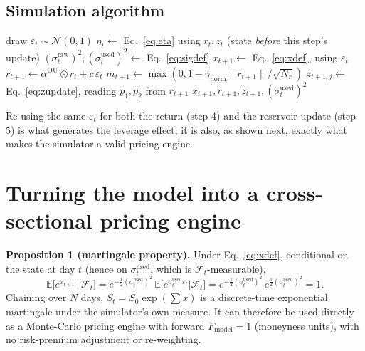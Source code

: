 \documentclass[11pt]{article}
\begin{document}
\subsection{Simulation algorithm}
\label{sec:algo}
\begin{algorithm}[h]
\caption{One simulated day, given state $(r_t,z_t,(\sigma_{t-1}^{\text{used}})^2)$}
\label{alg:day}
\begin{algorithmic}[1]
\State draw $\varepsilon_t\sim\mathcal N(0,1)$
\State $\eta_t \gets$ Eq.~\eqref{eq:eta} using $r_t,z_t$ (state \emph{before} this step's update)
\State $(\sigma_t^{\text{raw}})^2,(\sigma_t^{\text{used}})^2 \gets$ Eq.~\eqref{eq:sigdef}
\State $x_{t+1} \gets$ Eq.~\eqref{eq:xdef}, using $\varepsilon_t$
\State $r_{t+1} \gets \alpha^{\text{OU}}\odot r_t + c\,\varepsilon_t$ 
\State $m_{t+1} \gets \max(0,1-\gamma_{\text{norm}}\lVert r_{t+1}\rVert/\sqrt{N_r})$
    \State $z_{t+1,j} \gets$ Eq.~\eqref{eq:zupdate}, reading $p_1,p_2$ from $r_{t+1}$
\EndFor
\State \Return $x_{t+1}, r_{t+1}, z_{t+1}, (\sigma_t^{\text{used}})^2$
\end{algorithmic}
\end{algorithm}
Re-using the same $\varepsilon_t$ for both the return (step 4) and the
reservoir update (step 5) is what generates the leverage effect; it is
also, as shown next, exactly what makes the simulator a valid pricing
engine.

\FloatBarrier
\section{Turning the model into a cross-sectional pricing engine}
\label{sec:pricing}

\begin{note}
\textbf{Proposition 1 (martingale property).}
Under Eq.~\eqref{eq:xdef}, conditional on the state at day $t$ (hence
on $\sigma_t^{\text{used}}$, which is $\mathcal F_t$-measurable),
\[
\mathbb E\big[e^{x_{t+1}}\,\big|\,\mathcal F_t\big]
= e^{-\frac12(\sigma_t^{\text{used}})^2}\,\mathbb E\big[e^{\sigma_t^{\text{used}}\varepsilon_t}\big|\mathcal F_t\big]
= e^{-\frac12(\sigma_t^{\text{used}})^2}\,e^{\frac12(\sigma_t^{\text{used}})^2} = 1.
\]
Chaining over $N$ days, $S_t=S_0\exp(\sum x)$ is a discrete-time
exponential martingale under the simulator's own measure. It can
therefore be used directly as a Monte-Carlo pricing engine with
forward $F_{\text{model}}=1$ (moneyness units), with no risk-premium
adjustment or re-weighting.
\end{note}
\end{document}
